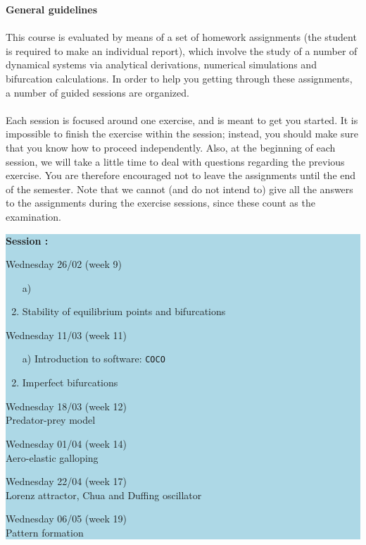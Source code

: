 \newpage
\vspace*{\fill}
{\Large \bf General guidelines}
\\ \\
This course is evaluated by means of a set of homework assignments (the student is required to make an individual report), which involve the study of a number of dynamical systems via analytical derivations, numerical simulations and bifurcation calculations. In order to help you getting through these assignments, a number of guided sessions are organized. \\ \\
Each session is focused around one exercise, and is meant to get you started. It is impossible to finish the exercise within the session; instead, you should make sure that you know how to proceed independently. Also, at the beginning of each session, we will take a little time to deal with questions regarding the previous exercise. You are therefore encouraged not to leave the assignments until the end of the semester. Note that we cannot (and do not intend to) give all the answers to the assignments during the exercise sessions, since these count as the examination.
\vspace*{\fill} 

\begin{center}
\colorbox{LightBlue}{\parbox{1\textwidth}{\newline
{\noindent 
\begin{list}
{\bfseries\upshape Session :}
{
\setlength{\labelwidth}{2cm}\setlength{\leftmargin}{2.6cm}
\setlength{\labelsep}{0.5cm}\setlength{\rightmargin}{1cm}
\setlength{\parsep}{0.05ex plus0.2ex minus0.1ex}}%
\item Wednesday 26/02 \quad (week 9)
\begin{enumerate}
	\item[a)] 
  \item[b)]  Stability of equilibrium points and bifurcations
\end{enumerate}
\item Wednesday 11/03 \quad (week 11)
\begin{enumerate}
	\item[a)] Introduction to software: \lstinline{COCO} \
  \item[b)]  Imperfect bifurcations
\end{enumerate}
\item Wednesday 18/03 \quad (week 12)  \\ \qquad Predator-prey model
\item Wednesday 01/04 \quad (week 14) \\ \qquad Aero-elastic galloping
\item Wednesday 22/04 \quad (week 17)  \\ \qquad Lorenz attractor, Chua and Duffing oscillator
\item Wednesday 06/05 \quad (week 19)  \\ \qquad Pattern formation
\end{list}}}}
\end{center}

\vspace*{\fill}

\newpage
